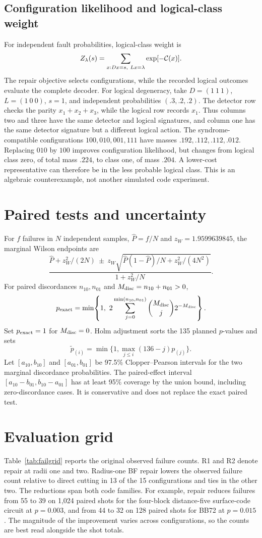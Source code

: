 \subsection{Configuration likelihood and logical-class weight}
For independent fault probabilities, logical-class weight is
\[Z_\lambda(s)=\sum_{x:Dx=s,\ Lx=\lambda}\exp[-\cost(x)].\]
The repair objective selects configurations, while the recorded logical outcomes evaluate the complete decoder. For logical degeneracy, take $D=(1\ 1\ 1)$, $L=(1\ 0\ 0)$, $s=1$, and independent probabilities $(.3,.2,.2)$. The detector row checks the parity $x_1+x_2+x_3$, while the logical row records $x_1$. Thus columns two and three have the same detector and logical signatures, and column one has the same detector signature but a different logical action. The syndrome-compatible configurations $100,010,001,111$ have masses $.192,.112,.112,.012$. Replacing $010$ by $100$ improves configuration likelihood, but changes from logical class zero, of total mass $.224$, to class one, of mass $.204$. A lower-cost representative can therefore be in the less probable logical class. This is an algebraic counterexample, not another simulated code experiment.

\section{Paired tests and uncertainty}\label{app:statistics}
For $f$ failures in $N$ independent samples, $\hat P=f/N$ and $z_W=1.9599639845$, the marginal Wilson endpoints are
\[\frac{\hat P+z_W^2/(2N)\ \pm\ z_W\sqrt{\hat P(1-\hat P)/N+z_W^2/(4N^2)}}{1+z_W^2/N}.\]
For paired discordances $n_{10},n_{01}$ and $M_{\rm disc}=n_{10}+n_{01}>0$,
\[p_{\rm exact}=\min\!\left\{1,\ 2\sum_{j=0}^{\min(n_{10},n_{01})}\binom{M_{\rm disc}}j2^{-M_{\rm disc}}\right\}.\]
Set $p_{\rm exact}=1$ for $M_{\rm disc}=0$. Holm adjustment sorts the 135 planned $p$-values and sets
\[\widetilde p_{(i)}=\min\{1,\max_{j\le i}(136-j)p_{(j)}\}.\]
Let $[a_{10},b_{10}]$ and $[a_{01},b_{01}]$ be 97.5\% Clopper--Pearson intervals for the two marginal discordance probabilities. The paired-effect interval $[a_{10}-b_{01},b_{10}-a_{01}]$ has at least 95\% coverage by the union bound, including zero-discordance cases. It is conservative and does not replace the exact paired test.

\section{Evaluation grid}\label{app:grid}
Table~\ref{tab:failgrid} reports the original observed failure counts. R1 and R2 denote repair at radii one and two. Radius-one BF repair lowers the observed failure count relative to direct cutting in 13 of the 15 configurations and ties in the other two. The reductions span both code families. For example, repair reduces failures from 55 to 39 on 1,024 paired shots for the four-block distance-five surface-code circuit at $p=0.003$, and from 44 to 32 on 128 paired shots for BB72 at $p=0.015$. The magnitude of the improvement varies across configurations, so the counts are best read alongside the shot totals.

